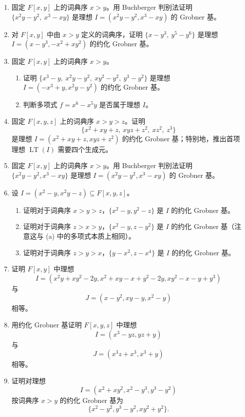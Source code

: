 \begin{enumerate}[label=\arabic*.]
	\item 固定 $F[x,y]$ 上的词典序 $x>y$。用 Buchberger 判别法证明 $\{x^2y-y^2,\ x^3-xy\}$ 是理想 $I=(x^2y-y^2,x^3-xy)$ 的 Grobner 基。
	
	\item 对 $F[x,y]$ 中由 $x>y$ 定义的词典序，证明 $\{x-y^3,\ y^5-y^6\}$ 是理想 $I=(x-y^3,-x^2+xy^2)$ 的约化 Grobner 基。
	
	\item 固定 $F[x,y]$ 上的词典序 $x>y$。
	\begin{enumerate}[label=(\alph*)]
		\item 证明 $\{x^3-y,\ x^2y-y^2,\ xy^2-y^2,\ y^3-y^2\}$ 是理想 $I=(-x^3+y,x^2y-y^2)$ 的约化 Grobner 基。
		\item 判断多项式 $f=x^6-x^5y$ 是否属于理想 $I$。
	\end{enumerate}
	
	\item 固定 $F[x,y,z]$ 上的词典序 $x>y>z$。证明
	\[
	\{x^2+xy+z,\ xyz+z^2,\ xz^2,\ z^3\}
	\]
	是理想 $I=(x^2+xy+z,xyz+z^2)$ 的约化 Grobner 基；特别地，推出首项理想 $\operatorname{LT}(I)$ 需要四个生成元。
	
	\item 固定 $F[x,y]$ 上的词典序 $x>y$。用 Buchberger 判别法证明 $\{x^2y-y^2,x^3-xy\}$ 是理想 $I=(x^2y-y^2,x^3-xy)$ 的 Grobner 基。
	
	\item 设 $I=(x^2-y,x^2y-z)\subseteq F[x,y,z]$。
	\begin{enumerate}[label=(\alph*)]
		\item 证明对于词典序 $x>y>z$，$\{x^2-y,y^2-z\}$ 是 $I$ 的约化 Grobner 基。
		\item 证明对于词典序 $z>x>y$，$\{x^2-y,z-y^2\}$ 是 $I$ 的约化 Grobner 基（注意这与 (a) 中的多项式本质上相同）。
		\item 证明对于词典序 $z>y>x$，$\{y-x^2,z-x^4\}$ 是 $I$ 的约化 Grobner 基。
	\end{enumerate}
	
	\item 证明 $F[x,y]$ 中理想
	\[
	I=(x^2y+xy^2-2y,
	x^2+xy-x+y^2-2y,
	xy^2-x-y+y^3)
	\]
	与
	\[
	J=(x-y^2,xy-y,x^2-y)
	\]
	相等。
	
	\item 用约化 Grobner 基证明 $F[x,y,z]$ 中理想
	\[
	I=(x^3-yz,
	yz+y)
	\]
	与
	\[
	J=(x^3z+x^3,
	x^3+y)
	\]
	相等。
	
	\item 证明对理想
	\[
	I=(x^2+xy^2,
	x^2-y^3,
	y^3-y^2)
	\]
	按词典序 $x>y$ 的约化 Grobner 基为
	\[
	\{x^2-y^2,
	y^3-y^2,
	xy^2+y^2\}.
	\]
	

\end{enumerate}
